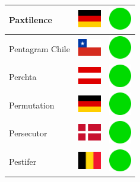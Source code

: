 \documentclass[12pt, a4paper, twoside]{report}
\begin{document}
\begin{center}
\begin{longtable}{|p{5cm}|p{2cm}|p{2cm}|}
 Paxtilence                                                 & \includegraphics[width=1cm]{../img/flags/de} &   \includegraphics[width=1cm]{../likes/y} \\ \hline
 Pentagram Chile                                            & \includegraphics[width=1cm]{../img/flags/cl} &   \includegraphics[width=1cm]{../likes/y} \\ \hline
 Perchta                                                    & \includegraphics[width=1cm]{../img/flags/at} &   \includegraphics[width=1cm]{../likes/y} \\ \hline
 Permutation                                                & \includegraphics[width=1cm]{../img/flags/de} &   \includegraphics[width=1cm]{../likes/y} \\ \hline
 Persecutor                                                 & \includegraphics[width=1cm]{../img/flags/dk} &   \includegraphics[width=1cm]{../likes/y} \\ \hline
 Pestifer                                                   & \includegraphics[width=1cm]{../img/flags/be} &   \includegraphics[width=1cm]{../likes/y} \\ \hline

\end{longtable}
\end{center}
\end{document}
